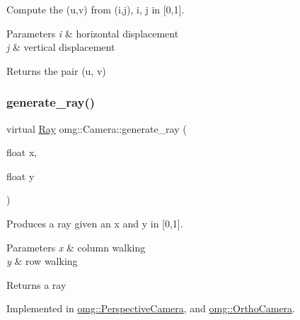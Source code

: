 Compute the (u,v) from (i,j), i, j in \mbox{[}0,1\mbox{]}. 


\begin{DoxyParams}{Parameters}
{\em i} & horizontal displacement \\
\hline
{\em j} & vertical displacement \\
\hline
\end{DoxyParams}
\begin{DoxyReturn}{Returns}
the pair (u, v) 
\end{DoxyReturn}
\mbox{\label{classomg_1_1_camera_aca08c044082cb3573d606a8c851f52fe}} 
\subsubsection{\texorpdfstring{generate\_ray()}{generate\_ray()}}
{\footnotesize\ttfamily virtual \mbox{\hyperlink{classomg_1_1_ray}{Ray}} omg\+::\+Camera\+::generate\+\_\+ray (\begin{DoxyParamCaption}\item[{float}]{x,  }\item[{float}]{y }\end{DoxyParamCaption})\hspace{0.3cm}{\ttfamily [pure virtual]}}



Produces a ray given an x and y in \mbox{[}0,1\mbox{]}. 


\begin{DoxyParams}{Parameters}
{\em x} & column walking \\
\hline
{\em y} & row walking \\
\hline
\end{DoxyParams}
\begin{DoxyReturn}{Returns}
a ray 
\end{DoxyReturn}


Implemented in \mbox{\hyperlink{classomg_1_1_perspective_camera_a6d849c2b0768f12aed7b50d3ce87afeb}{omg\+::\+Perspective\+Camera}}, and \mbox{\hyperlink{classomg_1_1_ortho_camera_af5dba96ad9cdf91121093d0c9d72e57f}{omg\+::\+Ortho\+Camera}}.

\mbox{\label{classomg_1_1_camera_ad9049467f7a5e4a3a089c789243b1463}} 
